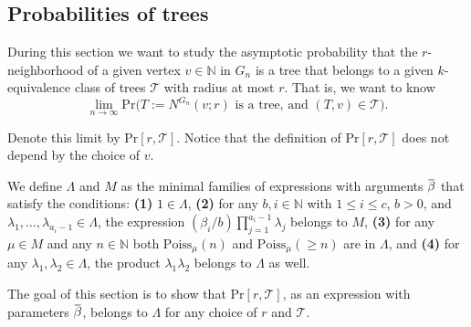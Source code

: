 \documentclass[12pt,notitlepage,a4paper]{article}
\theoremstyle{definition}
\newcommand{\N}{\mathbb{N}}
\newcommand{\Ln}{\lim\limits_{n\to \infty}}
\newcommand{\overbar}[1]{\mkern 1.5mu\overline{\mkern-1.5mu#1\mkern-1.5mu}\mkern 1.5mu}
\begin{document}
\subsection{Probabilities of trees}

During this section we want to study
the asymptotic probability that the 
$r$-neighborhood of a given vertex $v\in \N$
in $G_n$ 
is a tree that belongs to a given $k$-equivalence
class of trees $\mathcal{T}$ with radius at most
$r$. That is, we want to know
\[\Ln \mathrm{Pr}\big( 
T:=N^{G_n}(v;r) \text{ is a tree, and } (T,v)\in \mathcal{T} \big). 
\]

Denote this limit by $\mathrm{Pr}[r,\mathcal{T}]$. Notice that the 
definition of  $\mathrm{Pr}[r,\mathcal{T}]$ does not depend by the
choice of $v$.\par

We define $\Lambda$ and $M$ as the minimal families
of expressions with arguments $\overbar{\beta}$ that satisfy
 the conditions: \textbf{(1)} $1\in \Lambda$, \textbf{(2)} 
for any $b,i\in \N$ with $1\leq i \leq c$,
$b > 0$, and $\lambda_1,\dots, \lambda_{a_i-1}\in \Lambda$,
the expression $(\beta_i/b) \prod_{j=1}^{a_i-1}\lambda_j$
belongs to $M$,  \textbf{(3)}
for any $\mu\in M$ and any $n\in \N$ both
$\mathrm{Poiss}_{\mu}(n)$ and $\mathrm{Poiss}_\mu(\geq n)$ are in $\Lambda$, 
and  \textbf{(4)} for any $\lambda_1,\lambda_2 \in \Lambda$, the
product $\lambda_1\lambda_2$ belongs to $\Lambda$ as well.
\par
The goal of this section is to show 
that $\mathrm{Pr}[r,\mathcal{T}]$,
as an expression with parameters
$\overbar{\beta}$, belongs to $\Lambda$ for any choice of 
$r$ and $\mathcal{T}$. \par
\end{document}
